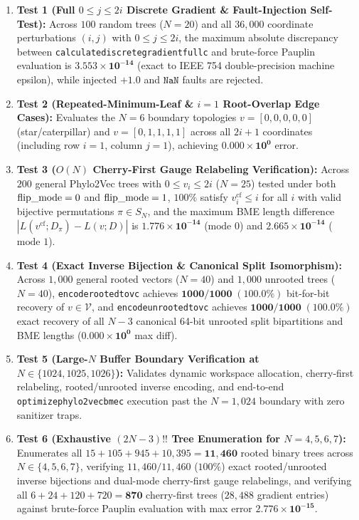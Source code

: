 \documentclass[11pt,a4paper]{article}
\makeatletter
\DeclareRobustCommand{\_}{\ifmmode\nfss@text{\textunderscore}\else\textunderscore\allowbreak\fi}
\theoremstyle{definition}
\makeatother
\begin{document}
\begin{enumerate}
    \item \textbf{Test 1 (Full $0 \le j \le 2i$ Discrete Gradient \& Fault-Injection Self-Test):} Across $100$ random trees ($N = 20$) and all $36{,}000$ coordinate perturbations $(i, j)$ with $0 \le j \le 2i$, the maximum absolute discrepancy between \texttt{calculate\_discrete\_gradient\_full\_c} and brute-force Pauplin evaluation is $\mathbf{3.553 \times 10^{-14}}$ (exact to IEEE 754 double-precision machine epsilon), while injected $+1.0$ and $\texttt{NaN}$ faults are rejected.
    \item \textbf{Test 2 (Repeated-Minimum-Leaf \& $i=1$ Root-Overlap Edge Cases):} Evaluates the $N=6$ boundary topologies $v = [0, 0, 0, 0, 0]$ (star/caterpillar) and $v = [0, 1, 1, 1, 1]$ across all $2i+1$ coordinates (including row $i=1$, column $j=1$), achieving $\mathbf{0.000 \times 10^{0}}$ error.
    \item \textbf{Test 3 ($O(N)$ Cherry-First Gauge Relabeling Verification):} Across $200$ general Phylo2Vec trees with $0 \le v_i \le 2i$ ($N = 25$) tested under both $\text{flip\_mode} = 0$ and $\text{flip\_mode} = 1$, $100\%$ satisfy $v^{\text{cf}}_i \le i$ for all $i$ with valid bijective permutations $\pi \in S_N$, and the maximum BME length difference $|L(v^{\text{cf}}; D_\pi) - L(v; D)|$ is $\mathbf{1.776 \times 10^{-14}}$ ($\text{mode } 0$) and $\mathbf{2.665 \times 10^{-14}}$ ($\text{mode } 1$).
    \item \textbf{Test 4 (Exact Inverse Bijection \& Canonical Split Isomorphism):} Across $1{,}000$ general rooted vectors ($N = 40$) and $1{,}000$ unrooted trees ($N = 40$), \texttt{encode\_rooted\_to\_v\_c} achieves $\mathbf{1000 / 1000 \; (100.0\%)}$ bit-for-bit recovery of $v \in \mathcal{V}$, and \texttt{encode\_unrooted\_to\_v\_c} achieves $\mathbf{1000 / 1000 \; (100.0\%)}$ exact recovery of all $N-3$ canonical 64-bit unrooted split bipartitions and BME lengths ($\mathbf{0.000 \times 10^{0}}$ max diff).
    \item \textbf{Test 5 (Large-$N$ Buffer Boundary Verification at $N \in \{1024, 1025, 1026\}$):} Validates dynamic workspace allocation, cherry-first relabeling, rooted/unrooted inverse encoding, and end-to-end \texttt{optimize\_phylo2vec\_bme\_c} execution past the $N=1{,}024$ boundary with zero sanitizer traps.
    \item \textbf{Test 6 (Exhaustive $(2N-3)!!$ Tree Enumeration for $N = 4, 5, 6, 7$):} Enumerates all $15 + 105 + 945 + 10{,}395 = \mathbf{11{,}460}$ rooted binary trees across $N \in \{4, 5, 6, 7\}$, verifying $11{,}460 / 11{,}460$ ($100\%$) exact rooted/unrooted inverse bijections and dual-mode cherry-first gauge relabelings, and verifying all $6 + 24 + 120 + 720 = \mathbf{870}$ cherry-first trees ($28{,}488$ gradient entries) against brute-force Pauplin evaluation with max error $\mathbf{2.776 \times 10^{-15}}$.

\end{enumerate}
\end{document}

